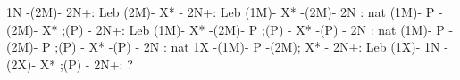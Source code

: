  1N -(2M)- 2N+: Leb
(2M)- X* - 2N+: Leb
(1M)- X* -(2M)- 2N : nat
(1M)- P  -(2M)- X* ;(P) - 2N+: Leb
(1M)- X* -(2M)- P  ;(P) - X* -(P) - 2N : nat
(1M)- P  -(2M)- P  ;(P) - X* -(P) - 2N : nat
 1X -(1M)- P  -(2M); X* - 2N+: Leb 
(1X)- 1N -(2X)- X* ;(P) - 2N+: ?
